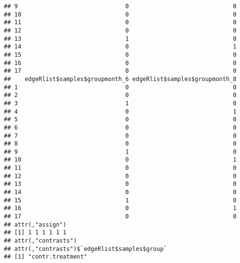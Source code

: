\documentclass[]{article}
\newenvironment{Shaded}{\begin{snugshade}}{\end{snugshade}}
\newcommand{\CommentTok}[1]{\textcolor[rgb]{0.56,0.35,0.01}{\textit{#1}}}
\newcommand{\KeywordTok}[1]{\textcolor[rgb]{0.13,0.29,0.53}{\textbf{#1}}}
\newcommand{\NormalTok}[1]{#1}
\newcommand{\OperatorTok}[1]{\textcolor[rgb]{0.81,0.36,0.00}{\textbf{#1}}}
\newcommand{\StringTok}[1]{\textcolor[rgb]{0.31,0.60,0.02}{#1}}
\begin{document}
\begin{verbatim}
## 9                               0                              0
## 10                              0                              0
## 11                              0                              0
## 12                              0                              0
## 13                              1                              0
## 14                              0                              1
## 15                              0                              0
## 16                              0                              0
## 17                              0                              0
##    edgeRlist$samples$groupmonth_6 edgeRlist$samples$groupmonth_8
## 1                               0                              0
## 2                               0                              0
## 3                               1                              0
## 4                               0                              1
## 5                               0                              0
## 6                               0                              0
## 7                               0                              0
## 8                               0                              0
## 9                               1                              0
## 10                              0                              1
## 11                              0                              0
## 12                              0                              0
## 13                              0                              0
## 14                              0                              0
## 15                              1                              0
## 16                              0                              1
## 17                              0                              0
## attr(,"assign")
## [1] 1 1 1 1 1 1
## attr(,"contrasts")
## attr(,"contrasts")$`edgeRlist$samples$group`
## [1] "contr.treatment"
\end{verbatim}

\begin{Shaded}
\end{Shaded}
\end{document}
